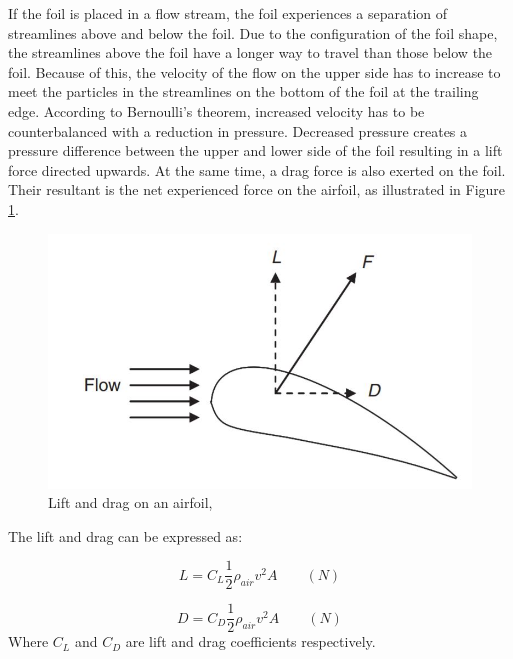 \noindent If the foil is placed in a flow stream, the foil experiences a separation of streamlines above and below the foil. Due to the configuration of the foil shape, the streamlines above the foil have a longer way to travel than those below the foil. Because of this, the velocity of the flow on the upper side has to increase to meet the particles in the streamlines on the bottom of the foil at the trailing edge. According to Bernoulli's theorem, increased velocity has to be counterbalanced with a reduction in pressure. Decreased pressure creates a pressure difference between the upper and lower side of the foil resulting in a lift force directed upwards. At the same time, a drag force is also exerted on the foil. Their resultant is the net experienced force on the airfoil, as illustrated in Figure \ref{fig:liftdrag}. 

\begin{figure}[H]
\centering
\includegraphics[scale=0.6]{figures/liftdrag}
\caption[$\; \:$Lift and drag on an airfoil]{Lift and drag on an airfoil, \cite{MATHEW2012} }
 \label{fig:liftdrag}
\end{figure}

 \noindent The lift and drag can be expressed as:

 \begin{equation}
    L = C_L\frac{1}{2}\rho_{air} v^2 A \qquad (N)
\end{equation}

\begin{equation}
    D = C_D\frac{1}{2}\rho_{air} v^2 A \qquad (N)
\end{equation}
Where $C_L$ and $C_D$ are lift and drag coefficients respectively.\newline 
\newline

